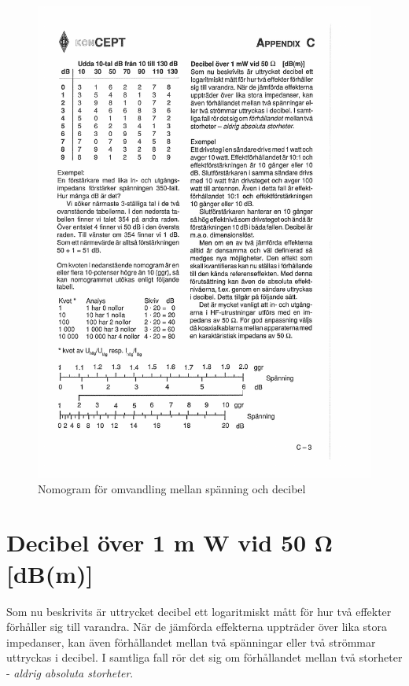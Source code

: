 \begin{rev-raderas}
\begin{figure}
  \includegraphics[width=\textwidth]{images/bild_appendix_c_nomogram}
  \caption{Nomogram för omvandling mellan spänning och decibel}
  \label{nomogram-db-spänning}
\end{figure}

\end{rev-raderas}

\section{Decibel över 1 m W vid 50 Ω [dB(m)]}

Som nu beskrivits är uttrycket decibel ett logaritmiskt mått för hur
två effekter förhåller sig till varandra. När de jämförda effekterna
uppträder över lika stora impedanser, kan även förhållandet mellan två
spänningar eller två strömmar uttryckas i decibel. I samtliga fall rör
det sig om förhållandet mellan två storheter - \emph{aldrig absoluta
  storheter}.

